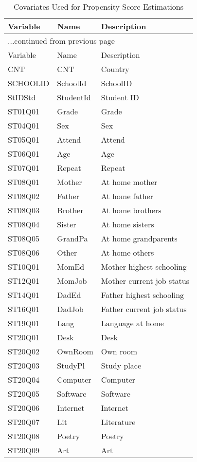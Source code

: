 \documentclass[letterpaper,11pt]{article}
\begin{document}
\begin{longtable}{lll}
\caption{Covariates Used for Propensity Score Estimations} \\ 
  \hline
  Variable & Name & Description \\ \endfirsthead \multicolumn{3}{l}{{...continued from previous page}}\\ \hline Variable & Name & Description  \\ \hline \endhead \hline
CNT & CNT & Country \\ 
  SCHOOLID & SchoolId & SchoolID \\ 
  StIDStd & StudentId & Student ID \\ 
  ST01Q01 & Grade & Grade \\ 
  ST04Q01 & Sex & Sex \\ 
  ST05Q01 & Attend & Attend \\ 
  ST06Q01 & Age & Age \\ 
  ST07Q01 & Repeat & Repeat \\ 
  ST08Q01 & Mother & At home mother \\ 
  ST08Q02 & Father & At home father \\ 
  ST08Q03 & Brother & At home brothers \\ 
  ST08Q04 & Sister & At home sisters \\ 
  ST08Q05 & GrandPa & At home grandparents \\ 
  ST08Q06 & Other & At home others \\ 
  ST10Q01 & MomEd & Mother highest schooling \\ 
  ST12Q01 & MomJob & Mother current job status \\ 
  ST14Q01 & DadEd & Father highest schooling \\ 
  ST16Q01 & DadJob & Father current job status \\ 
  ST19Q01 & Lang & Language at home \\ 
  ST20Q01 & Desk & Desk \\ 
  ST20Q02 & OwnRoom & Own room \\ 
  ST20Q03 & StudyPl & Study place \\ 
  ST20Q04 & Computer & Computer \\ 
  ST20Q05 & Software & Software \\ 
  ST20Q06 & Internet & Internet \\ 
  ST20Q07 & Lit & Literature \\ 
  ST20Q08 & Poetry & Poetry \\ 
  ST20Q09 & Art & Art \\ 

\end{longtable}
\end{document}
